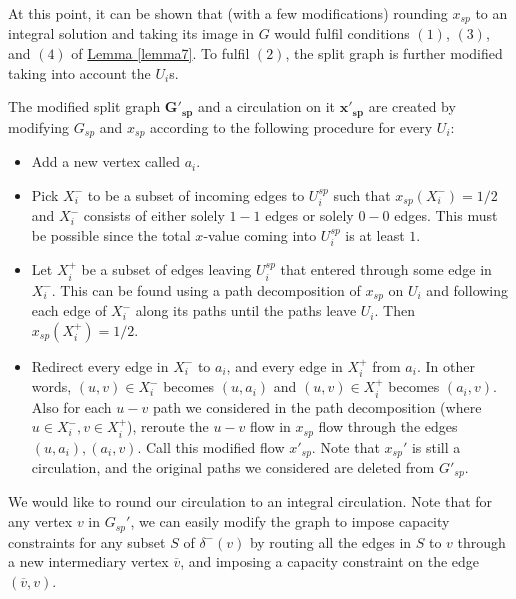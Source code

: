 \documentclass[./main.tex]{subfiles}
\begin{document}
		At this point, it can be shown that (with a few modifications) rounding $x_{sp}$ to an integral solution and taking its image in $G$ would fulfil conditions $(1)$, $(3)$, and $(4)$ of \hyperref[lemma7]{Lemma \ref{lemma7}}. To fulfil $(2)$, the split graph is further modified taking into account the $U_i$s.\\
		\vspace{2mm}

		\begin{definition}\label{def:6.1}
			The modified split graph $\bm{G'_{sp}}$ and a circulation on it $\bm{x'_{sp}}$ are created by modifying $G_{sp}$ and $x_{sp}$ according to the following procedure for every $U_i$:
			\begin{itemize}[-]
				\item Add a new vertex called $a_i$.

				\item Pick $X_i^-$ to be a subset of incoming edges to $U_i^{sp}$ such that $x_{sp}(X_i^-) = 1/2$ and $X_i^-$ consists of either solely $1-1$ edges or solely $0-0$ edges. This must be possible since the total $x$-value coming into $U_i^{sp}$ is at least $1$.

				\item Let $X_i^+$ be a subset of edges leaving $U_i^{sp}$ that entered through some edge in $X_i^-$. This can be found using a path decomposition of $x_{sp}$ on $U_i$ and following each edge of $X_i^-$ along its paths until the paths leave $U_i$. Then $x_{sp}(X_i^+) = 1/2$.

				\item Redirect every edge in $X_i^-$ to $a_i$, and every edge in $X_i^+$ from $a_i$. In other words, $(u,v)\in X_i^-$ becomes $(u,a_i)$ and $(u,v)\in X_i^+$ becomes $(a_i, v)$. Also for each $u-v$ path we considered in the path decomposition (where $u\in X_i^-, v\in X_i^+$), reroute the $u-v$ flow in $x_{sp}$ flow through the edges $(u,a_i),(a_i,v)$. Call this modified flow $x'_{sp}$. Note that $x_{sp}'$ is still a circulation, and the original paths we considered are deleted from $G'_{sp}$.\\
			\end{itemize}
		\end{definition}
		We would like to round our circulation to an integral circulation.
		Note that for any vertex $v$ in $G_{sp}'$, we can easily modify the graph to impose capacity constraints for any subset $S$ of $\delta^-(v)$ by routing all the edges in $S$ to $v$ through a new intermediary vertex $\overline{v}$, and imposing a capacity constraint on the edge $(\overline{v},v)$.
\end{document}
